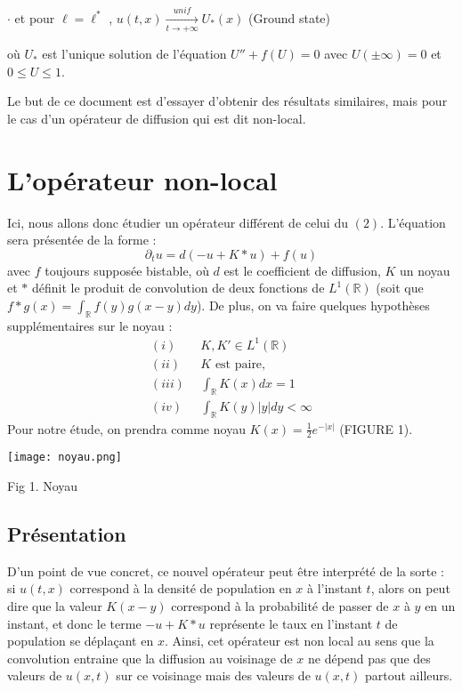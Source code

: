 \documentclass{article}
\begin{document}
$\cdot$ et pour $\ell = \ell^* $ , $u(t,x) \underset{t \to +\infty}{\overset{unif}{\longrightarrow}}U_{*}(x)$ (Ground state)

\noindent où $U_*$ est l'unique solution de l'équation $U'' + f(U) = 0$ avec $U(\pm \infty) = 0$ et $ 0 \le U \le 1 $. \newline 

Le but de ce document est d'essayer d'obtenir des résultats similaires, mais pour le cas d'un opérateur de diffusion qui est dit non-local.

\section{L'opérateur non-local}

\indent Ici, nous allons donc étudier un opérateur différent de celui du $(2)$. L'équation sera présentée de la forme : 
\begin{equation}
\partial_t u =  d(-u + K*u)+f(u)
\end{equation}
avec $f$ toujours supposée bistable, où $d$ est le coefficient de diffusion, $K$ un noyau et $*$ définit le produit de convolution de deux fonctions de $L^1(\mathbb{R})$ (soit que $f*g(x) = \int_{\mathbb{R}}f(y)g(x-y)dy$). De plus, on va faire quelques hypothèses supplémentaires sur le noyau :
\begin{equation}
\begin{split}
(i)~~ &K, K' \in L^1(\mathbb{R}) \\
(ii)~~ & K \text{ est paire, } \\
(iii) ~~& \int_\mathbb{R} K(x)dx = 1 \\
(iv) ~~& \int_\mathbb{R} K(y)|y|dy < \infty
\end{split}
\end{equation}
Pour notre étude, on prendra comme noyau $K(x) = \frac{1}{2} e^{-|x|} $ (FIGURE 1).

\begin{center}
\texttt{[image: noyau.png]}

Fig 1. Noyau
\end{center}

\subsection{Présentation}
\indent D'un point de vue concret, ce nouvel opérateur peut être interprété de la sorte : si $u(t,x)$ correspond à la densité de population en $x$ à l'instant $t$, alors on peut dire que la valeur $K(x-y)$ correspond à la probabilité de passer de $x$ à $y$ en un instant, et donc le terme $-u + K*u$  représente le taux en l'instant $t$ de population se déplaçant en $x$. Ainsi, cet opérateur est non local au sens que la convolution entraine que la diffusion au voisinage de $x$ ne dépend pas que des valeurs de $u(x,t)$ sur ce voisinage mais des valeurs de $u(x,t)$ partout ailleurs. 
\end{document}
